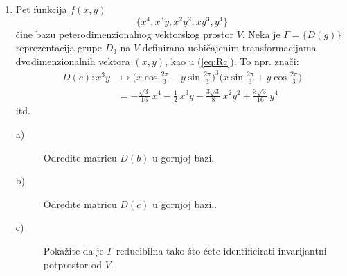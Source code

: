 \begin{enumerate}[label=\arabic{chapter}.\arabic*.]
\item
Pet funkcija $f(x,y)$
\[
    \{x^4, x^3y, x^2y^2, xy^3, y^4\}
\]
čine bazu peterodimenzionalnog vektorskog prostor $V$. Neka je $\Gamma=
\{D(g)\}$
reprezentacija grupe $D_3$ na $V$ definirana uobičajenim transformacijama
dvodimenzionalnih vektora $(x,y)$, kao u (\ref{eq:Rc}). To npr. znači:
\begin{align*}
   D(c): x^3y &\mapsto \bigg(x\cos\frac{2\pi}{3}-y\sin\frac{2\pi}{3}\bigg)^3
\bigg(x\sin\frac{2\pi}{3}+y\cos\frac{2\pi}{3}\bigg) \\
 &= -\frac{\sqrt{3}}{16} \,  x^{4}  - \frac{1}{2} \, x^{3} y
   - \frac{3\sqrt{3}}{8} \,  x^{2} y^{2} + \frac{3\sqrt{3}}{16} \,  y^{4}
\end{align*}
itd. 
\begin{description}
\item[a)] Odredite matricu $D(b)$ u gornjoj bazi. 
\item[b)] Odredite matricu $D(c)$ u gornjoj bazi.. 
\item[c)] Pokažite da je $\Gamma$ reducibilna tako što ćete identificirati
invarijantni potprostor od $V$.
\end{description}


\end{enumerate}

